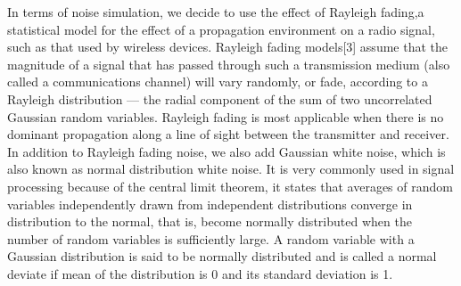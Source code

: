 \par
	In terms of noise simulation, we decide to use the effect of Rayleigh fading,a statistical model for the effect of a propagation environment on a radio signal, such as that used by wireless devices. Rayleigh fading models[3] assume that the magnitude of a signal that has passed through such a transmission medium (also called a communications channel) will vary randomly, or fade, according to a Rayleigh distribution — the radial component of the sum of two uncorrelated Gaussian random variables. Rayleigh fading is most applicable when there is no dominant propagation along a line of sight between the transmitter and receiver. In addition to Rayleigh fading noise, we also add Gaussian white noise, which is also known as normal distribution white noise. It is very commonly used in signal processing because of the central limit theorem, it states that averages of random variables independently drawn from independent distributions converge in distribution to the normal, that is, become normally distributed when the number of random variables is sufficiently large.  A random variable with a Gaussian distribution is said to be normally distributed and is called a normal deviate if mean of the distribution is 0 and its standard deviation is 1.


